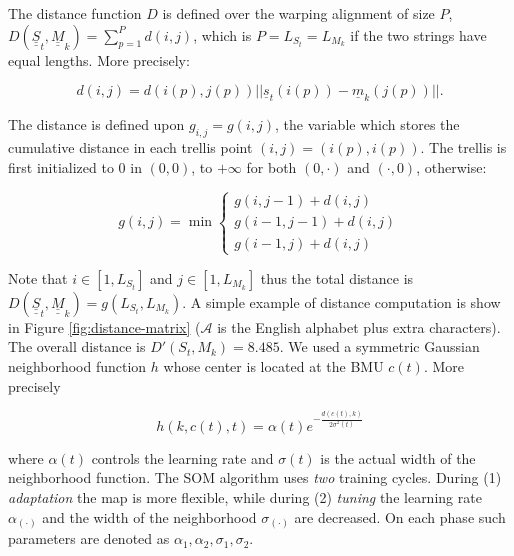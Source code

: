 The distance function $D$ is defined over the warping alignment of size $P$, $D(\underline{\underline{S}}_{t}, \underline{\underline{M}}_{k}) = \sum_{p = 1}^{P} d(i,j)$, which is $P = L_{S_{t}} = L_{M_{k}}$ if the two strings have equal lengths. More precisely:

\begin{displaymath}
  d(i,j) = d(i(p), j(p)) ||\underline{s}_{t}(i(p)) - \underline{m}_{k}(j(p))||.
\end{displaymath}

The distance is defined upon $g_{i,j} = g(i, j)$, the variable which stores the cumulative distance in each trellis point $(i, j) = (i(p), i(p))$. The trellis is first initialized to $0$ in $(0,0)$, to $+\infty$ for both $(0,\cdot)$ and $(\cdot,0)$, otherwise:

\begin{displaymath}
  g(i,j) = \min\left\{
    \begin{array}{l}
      g(i,j-1) + d(i,j)\\
      g(i-1,j-1) + d(i,j)\\
      g(i-1,j) + d(i,j)
    \end{array}\right.
\end{displaymath}

Note that $i \in [1, L_{S_{t}}]$ and $j \in [1, L_{M_{k}}]$ thus the total distance is $D(\underline{\underline{S}}_{t}, \underline{\underline{M}}_{k}) = g(L_{S_{t}}, L_{M_{k}})$. A simple example of distance computation is show in Figure \ref{fig:distance-matrix} ($\mathcal{A}$ is the English alphabet plus extra characters). The overall distance is $D'(S_{t}, M_{k}) = 8.485$. We used a symmetric Gaussian neighborhood function $h$ whose center is located at the \ac{BMU} $c(t)$. More precisely

\begin{displaymath}
  h(k, c(t), t) = \alpha(t) e^{-\frac{d(c(t),k)}{2\sigma^{2}(t)}}
\end{displaymath}


where $\alpha(t)$ controls the learning rate and $\sigma(t)$ is the actual width of the neighborhood function. The \ac{SOM} algorithm uses \emph{two} training cycles. During (1) \emph{adaptation} the map is more flexible, while during (2) \emph{tuning} the learning rate $\alpha_{(\cdot)}$ and the width of the neighborhood $\sigma_{(\cdot)}$ are decreased. On each phase such parameters are denoted as $\alpha_{1}, \alpha_{2}, \sigma_{1}, \sigma_{2}$.

